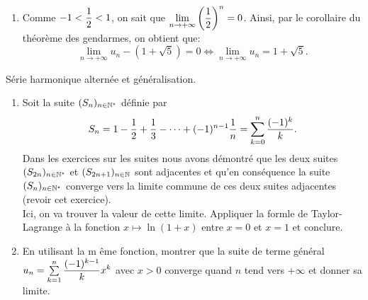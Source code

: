 \documentclass[a4paper, 11pt,reqno]{article}
\begin{document}
\begin{correction}
\begin{enumerate}
\begin{itemize}
			            $$\left| u_n-(1+\sqrt{5})\right| \leq \left( \ddp\demi\right)^n \left| u_0-(1+\sqrt{5})\right|.$$
			            De plus, d'apr\`es la question pr\'ec\'edente, on sait aussi que:
			            $$\left| u_{n+1}-(1+\sqrt{5})\right| \leq \ddp\demi \left| u_n-(1+\sqrt{5})\right|.$$
			            Ainsi, on obtient que
			            $$\left| u_{n+1}-(1+\sqrt{5})\right| \leq \ddp\demi \times \left( \ddp\demi\right)^n \left| u_0-(1+\sqrt{5})\right|,$$
			            \`a savoir: $\left| u_{n+1}-(1+\sqrt{5})\right| \leq \left( \ddp\demi\right)^{n+1} \left| u_0-(1+\sqrt{5})\right|$. Donc $\mathcal{P}(n+1)$ est vraie.
			      \item[$\bullet$]  Conclusion: il r\'esulte du principe de r\'ecurrence que:
			            $$\forall n\in\N,\quad \left| u_n-(1+\sqrt{5})\right| \leq \left( \ddp\demi\right)^n \left| u_0-(1+\sqrt{5})\right|.$$
		      \end{itemize}
		\item Comme $-1<\displaystyle\frac{1}{2}<1$, on sait que $\lim\limits_{n\to +\infty} \left(\displaystyle\frac{1}{2} \right)^n=0$. Ainsi, par le corollaire du th\'eor\`eme des gendarmes, on obtient que:
		      $$\lim\limits_{n \to +\infty} u_n-(1+\sqrt{5})=0\Leftrightarrow \lim\limits_{n\to +\infty} u_n=1+\sqrt{5}.$$
	\end{enumerate}
\end{correction}
\begin{exercice} S\'erie harmonique altern\'ee et g\'en\'eralisation.
	\begin{enumerate}
		\item
		      Soit la suite $(S_n)_{n\in\mathbb{N}^{\star}}$ d\'efinie par
		      $$S_n=1-\displaystyle\frac{1}{2}+\displaystyle\frac{1}{3}-\dots+(-1)^{n-1}\displaystyle\frac{1}{n}=\sum\limits_{k=0}^n \displaystyle\frac{(-1)^k}{k}.$$
		      Dans les exercices sur les suites nous avons d\'emontr\'e que les deux suites $(S_{2n})_{n\in\mathbb{N}^{\star}}$ et $(S_{2n+1})_{n\in\mathbb{N}}$ sont adjacentes et qu'en cons\'equence la suite $(S_n)_{n\in\mathbb{N}^{\star}}$ converge vers la limite commune de ces deux suites adjacentes (revoir cet exercice).\\
		      \noindent Ici, on va trouver la valeur de cette limite. Appliquer la formle de Taylor-Lagrange \`a la fonction $x\mapsto \ln{(1+x)}$ entre $x=0$ et $x=1$ et conclure.
		\item En utilisant la m \^eme fonction, montrer que la suite de terme g\'en\'eral $u_n=\sum\limits_{k=1}^n \displaystyle\frac{(-1)^{k-1}}{k} x^k$ avec $x>0$ converge quand $n$ tend vers $+\infty$ et donner sa limite.
	\end{enumerate}
\end{exercice}
\end{document}
